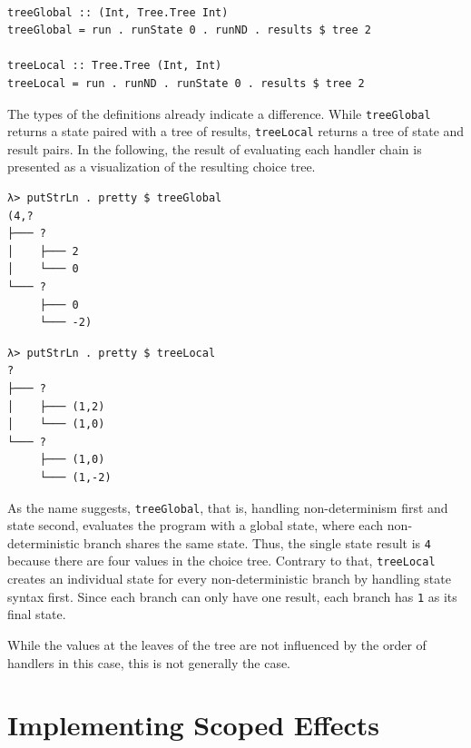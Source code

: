 \documentclass[a4paper, 11pt, fleqn, twoside, abstract=on]{scrreprt}
\newcommand{\hinl}[1]{\texttt{#1}}
\begin{document}
\begin{verbatim}

treeGlobal :: (Int, Tree.Tree Int)
treeGlobal = run . runState 0 . runND . results $ tree 2

treeLocal :: Tree.Tree (Int, Int)
treeLocal = run . runND . runState 0 . results $ tree 2
\end{verbatim}

The types of the definitions already indicate a difference.
While \hinl{treeGlobal} returns a state paired with a tree of results, \hinl{treeLocal} returns a tree of state and result pairs.
In the following, the result of evaluating each handler chain is presented as a visualization of the resulting choice tree.

\vspace{0.32cm}

\begin{minipage}{.465 \linewidth}
\begin{verbatim}
λ> putStrLn . pretty $ treeGlobal
(4,?
├─── ?
│    ├─── 2
│    └─── 0
└─── ?
     ├─── 0
     └─── -2)
\end{verbatim}
\end{minipage}
\hfill
\vline
\hfill
\begin{minipage}{.475 \linewidth}
\begin{verbatim}
λ> putStrLn . pretty $ treeLocal
?
├─── ?
│    ├─── (1,2)
│    └─── (1,0)
└─── ?
     ├─── (1,0)
     └─── (1,-2)
\end{verbatim}
\end{minipage}

\vspace{0.32cm}

As the name suggests, \hinl{treeGlobal}, that is, handling non-determinism first and state second, evaluates the program with a global state, where each non-deterministic branch shares the same state.
Thus, the single state result is \hinl{4} because there are four values in the choice tree.
Contrary to that, \hinl{treeLocal} creates an individual state for every non-deterministic branch by handling state syntax first.
Since each branch can only have one result, each branch has \hinl{1} as its final state.

While the values at the leaves of the tree are not influenced by the order of handlers in this case, this is not generally the case.

\section{Implementing Scoped Effects}
\label{sec:sharing}
\end{document}
